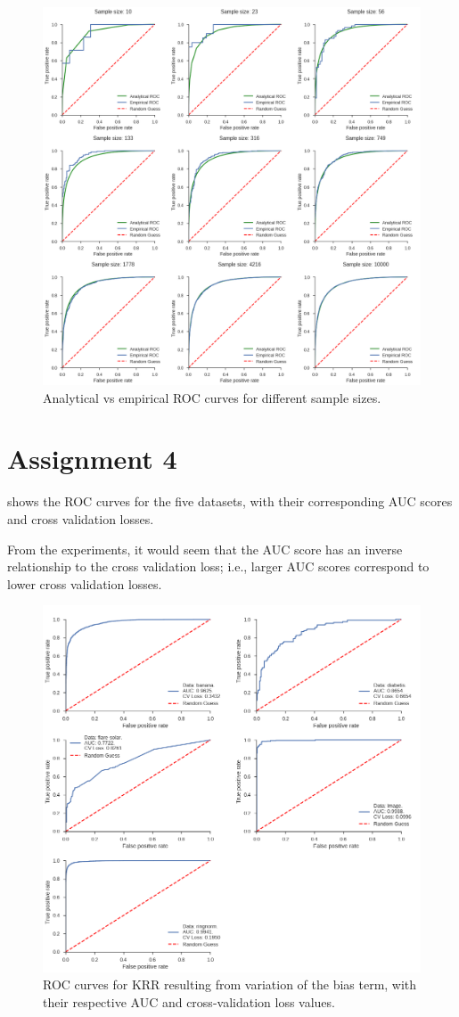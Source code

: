 \documentclass[a4paper,11pt]{article}
\begin{document}
\begin{figure}
  \centering
  \includegraphics[width=\textwidth]{images/assignment_3.png}
  \caption{Analytical vs empirical ROC curves for different sample sizes.}
  \label{fig:assignment3}
\end{figure}


\section*{Assignment 4}

 shows the ROC curves for the five datasets, with their corresponding AUC scores and cross validation losses.

From the experiments, it would seem that the AUC score has an inverse relationship to the cross validation loss; i.e., larger AUC scores correspond to lower cross validation losses.

\begin{figure}
	\centering
	\includegraphics[width=\textwidth]{images/assignment_4.png}
	\caption{ROC curves for KRR resulting from variation of the bias term, with their respective AUC and cross-validation loss values.}
	\label{fig:assignment4}
\end{figure}
\end{document}
